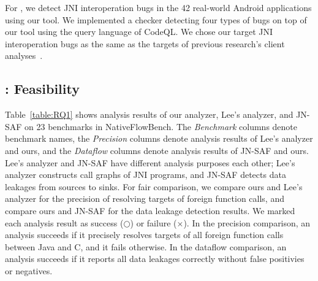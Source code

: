 
For , we detect JNI interoperation bugs in the 42 real-world Android
applications using our tool. We implemented a checker detecting four types of
bugs on top of our tool using the query language of CodeQL. We chose our target
JNI interoperation bugs as the same as the targets of previous research's
client analyses~\cite{LeeASE20, ILEA}.


\subsection{: Feasibility}
Table~\ref{table:RQ1} shows analysis results of our analyzer, Lee's analyzer,
and JN-SAF on 23 benchmarks in NativeFlowBench.  The {\it Benchmark} columns
denote benchmark names, the {\it Precision} columns denote analysis results of
Lee's analyzer and ours, and the {\it Dataflow} columns denote analysis results
of JN-SAF and ours.  Lee's analyzer and JN-SAF have different analysis purposes
each other; Lee's analyzer constructs call graphs of JNI programs, and JN-SAF
detects data leakages from sources to sinks. For fair comparison, we compare
ours and Lee's analyzer for the precision of resolving targets of foreign
function calls, and compare ours and JN-SAF for the data leakage detection
results. We marked each analysis result as success ($\bigcirc$) or
failure ($\times$). In the precision comparison, an analysis succeeds if
it precisely resolves targets of all foreign function calls between Java and C,
and it fails otherwise. In the dataflow comparison, an analysis succeeds
if it reports all data leakages correctly without false positivies or
negatives.



